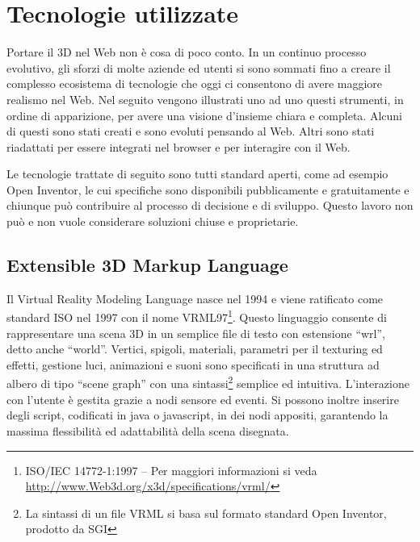 \chapter{Tecnologie utilizzate}                 

Portare il 3D nel Web non è cosa di poco conto. In un continuo processo evolutivo, gli sforzi di molte aziende ed utenti si sono sommati fino a creare il complesso ecosistema di tecnologie che oggi ci consentono di avere maggiore realismo nel Web. Nel seguito vengono illustrati uno ad uno questi strumenti, in ordine di apparizione, per avere una visione d'insieme chiara e completa. Alcuni di questi sono stati creati e sono evoluti pensando al Web. Altri sono stati riadattati per essere integrati nel browser e per interagire con il Web.
 
Le tecnologie trattate di seguito sono tutti standard aperti, come ad esempio Open Inventor\cite{OpenInventor}, le cui specifiche sono disponibili pubblicamente e gratuitamente e chiunque può contribuire al processo di decisione e di sviluppo. Questo lavoro non può e non vuole considerare soluzioni chiuse e proprietarie.

\section{Extensible 3D Markup Language}
Il Virtual Reality Modeling Language nasce nel 1994 e viene ratificato come standard ISO nel 1997 con il nome VRML97\footnote{ISO/IEC 14772-1:1997 – Per maggiori informazioni si veda \url{http://www.Web3d.org/x3d/specifications/vrml/}}. Questo linguaggio consente di rappresentare una scena 3D in un semplice file di testo con estensione “wrl”, detto anche “world”. Vertici, spigoli, materiali, parametri per il texturing ed effetti, gestione luci, animazioni e suoni sono specificati in una struttura ad albero di tipo “scene graph” con una sintassi\footnote{La sintassi di un file VRML si basa sul formato standard Open Inventor, prodotto da SGI} semplice ed intuitiva. L'interazione con l'utente è gestita grazie a nodi sensore ed eventi. Si possono inoltre inserire degli script, codificati in java o javascript, in dei nodi appositi, garantendo la massima flessibilità ed adattabilità della scena disegnata.

